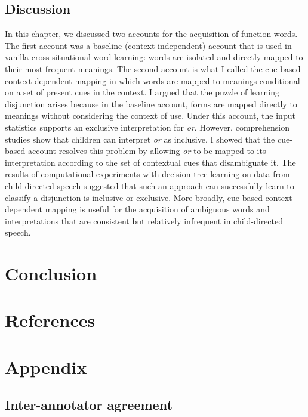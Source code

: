 \documentclass[floatsintext,man]{apa6}
\theoremstyle{definition}
\theoremstyle{definition}
\theoremstyle{definition}
\theoremstyle{remark}
\begin{document}
\subsection{Discussion}\label{discussion-1}

In this chapter, we discussed two accounts for the acquisition of
function words. The first account was a baseline (context-independent)
account that is used in vanilla cross-situational word learning: words
are isolated and directly mapped to their most frequent meanings. The
second account is what I called the cue-based context-dependent mapping
in which words are mapped to meanings conditional on a set of present
cues in the context. I argued that the puzzle of learning disjunction
arises because in the baseline account, forms are mapped directly to
meanings without considering the context of use. Under this account, the
input statistics supports an exclusive interpretation for \emph{or}.
However, comprehension studies show that children can interpret
\emph{or} as inclusive. I showed that the cue-based account resolves
this problem by allowing \emph{or} to be mapped to its interpretation
according to the set of contextual cues that disambiguate it. The
results of computational experiments with decision tree learning on data
from child-directed speech suggested that such an approach can
successfully learn to classify a disjunction is inclusive or exclusive.
More broadly, cue-based context-dependent mapping is useful for the
acquisition of ambiguous words and interpretations that are consistent
but relatively infrequent in child-directed speech.

\section{Conclusion}\label{conclusion}

\newpage

\section{References}\label{references}

\section{Appendix}\label{appendix}

\subsection{Inter-annotator agreement}\label{inter-annotator-agreement}
\end{document}
